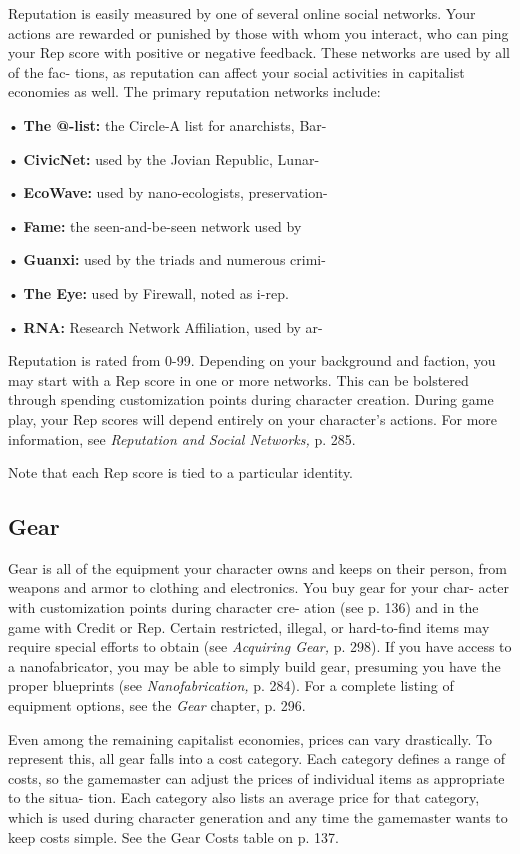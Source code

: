 Reputation is easily measured by one of several 
online social networks. Your actions are rewarded 
or punished by those with whom you interact, who 
can ping your Rep score with positive or negative 
feedback. These networks are used by all of the fac-
tions, as reputation can affect your social activities in 
capitalist economies as well. The primary reputation 
networks include:

•  \textbf{The @-list:} the Circle-A list for anarchists, Bar-

•  \textbf{CivicNet:} used by the Jovian Republic, Lunar-

•  \textbf{EcoWave:} used by nano-ecologists, preservation-

•  \textbf{Fame:} the seen-and-be-seen network used by 

•  \textbf{Guanxi:} used by the triads and numerous crimi-

•  \textbf{The Eye:} used by Firewall, noted as i-rep.

•  \textbf{RNA:} Research Network Affiliation, used by ar-

Reputation is rated from 0-99. Depending on 
your background and faction, you may start with 
a Rep score in one or more networks. This can be 
bolstered through spending customization points 
during character creation. During game play, your 
Rep scores will depend entirely on your character's 
actions. For more information, see \textit{Reputation and }
\textit{Social Networks,} p. 285.

Note that each Rep score is tied to a particular 
identity.

\subsection{Gear}

Gear is all of the equipment your character owns and 
keeps on their person, from weapons and armor to 
clothing and electronics. You buy gear for your char-
acter with customization points during character cre-
ation (see p. 136) and in the game with Credit or Rep. 
Certain restricted, illegal, or hard-to-find items may 
require special efforts to obtain (see \textit{Acquiring Gear,} 
p. 298). If you have access to a nanofabricator, you 
may be able to simply build gear, presuming you have 
the proper blueprints (see \textit{Nanofabrication,} p. 284). 
For a complete listing of equipment options, see the 
\textit{Gear} chapter, p. 296.

Even among the remaining capitalist economies, 
prices can vary drastically. To represent this, all 
gear falls into a cost category. Each category defines 
a range of costs, so the gamemaster can adjust the 
prices of individual items as appropriate to the situa-
tion. Each category also lists an average price for that 
category, which is used during character generation 
and any time the gamemaster wants to keep costs 
simple. See the Gear Costs table on p. 137.

